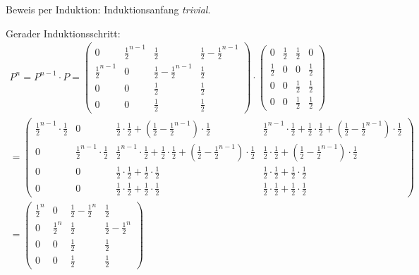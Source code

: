 \documentclass[a4paper,11pt,notitlepage,fullpage]{article}
\begin{document}
\begin{enumerate}
\begin{enumerate}
Beweis per Induktion: Induktionsanfang \emph{trivial}.

Gerader Induktionsschritt:
\begin{gather*}
P^n = P^{n-1} \cdot P = \begin{pmatrix}
0&\frac{1}{2}^{n-1}&\frac{1}{2}&\frac{1}{2}-\frac{1}{2}^{n-1} \\
\frac{1}{2}^{n-1}&0&\frac{1}{2}-\frac{1}{2}^{n-1}&\frac{1}{2} \\
0&0&\frac{1}{2}&\frac{1}{2}\\
0&0&\frac{1}{2}&\frac{1}{2}
\end{pmatrix} \cdot \begin{pmatrix}
0&\frac{1}{2}&\frac{1}{2}&0 \\
\frac{1}{2}&0&0&\frac{1}{2} \\
0&0&\frac{1}{2}&\frac{1}{2}\\
0&0&\frac{1}{2}&\frac{1}{2}
\end{pmatrix} \\
= \begin{pmatrix}
\frac{1}{2}^{n-1} \cdot \frac{1}{2} & 0 & \frac{1}{2}\cdot\frac{1}{2} + (\frac{1}{2} - \frac{1}{2}^{n-1})\cdot\frac{1}{2} & \frac{1}{2}^{n-1} \cdot \frac{1}{2} + \frac{1}{2}\cdot\frac{1}{2} +  (\frac{1}{2} - \frac{1}{2}^{n-1})\cdot\frac{1}{2}\\
0 & \frac{1}{2}^{n-1} \cdot \frac{1}{2} & \frac{1}{2}^{n-1} \cdot \frac{1}{2} + \frac{1}{2}\cdot\frac{1}{2} +  (\frac{1}{2} - \frac{1}{2}^{n-1})\cdot\frac{1}{2} & \frac{1}{2}\cdot\frac{1}{2} + (\frac{1}{2} - \frac{1}{2}^{n-1})\cdot\frac{1}{2} \\
0&0&\frac{1}{2}\cdot\frac{1}{2} + \frac{1}{2}\cdot\frac{1}{2}&\frac{1}{2}\cdot\frac{1}{2} + \frac{1}{2}\cdot\frac{1}{2}\\
0&0&\frac{1}{2}\cdot\frac{1}{2} + \frac{1}{2}\cdot\frac{1}{2}&\frac{1}{2}\cdot\frac{1}{2} + \frac{1}{2}\cdot\frac{1}{2}
\end{pmatrix} \\
= \begin{pmatrix}
\frac{1}{2}^n&0&\frac{1}{2}-\frac{1}{2}^n&\frac{1}{2} \\
0&\frac{1}{2}^n&\frac{1}{2}&\frac{1}{2}-\frac{1}{2}^n \\
0&0&\frac{1}{2}&\frac{1}{2}\\
0&0&\frac{1}{2}&\frac{1}{2}
\end{pmatrix}
\end{gather*}


\end{enumerate}
\end{enumerate}
\end{document}
